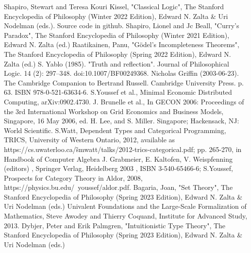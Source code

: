 \documentclass[11pt]{article}
\begin{document}
\begin{thebibliography}{10}
 Shapiro, Stewart and Teresa Kouri Kissel, "Classical Logic", The Stanford Encyclopedia of Philosophy (Winter 2022 Edition), Edward N. Zalta \& Uri Nodelman (eds.).
 Source code in github. 
 Shapiro, Lionel and Jc Beall, "Curry’s Paradox", The Stanford Encyclopedia of Philosophy (Winter 2021 Edition), Edward N. Zalta (ed.)
 Raatikainen, Panu, "Gödel’s Incompleteness Theorems", The Stanford Encyclopedia of Philosophy (Spring 2022 Edition), Edward N. Zalta (ed.)
 S. Yablo (1985). "Truth and reflection". Journal of Philosophical Logic. 14 (2): 297–348. doi:10.1007/BF00249368.
 Nicholas Griffin (2003-06-23). The Cambridge Companion to Bertrand Russell. Cambridge University Press. p. 63. ISBN 978-0-521-63634-6.
 S.Youssef et al., Minimal Economic Distributed Computing, arXiv:0902.4730.  J. Brunelle et al., In GECON 2006: Proceedings of the 3rd International Workshop on Grid Economics and Business Models, Singapore, 16 May 2006, ed. H. Lee, and S. Miller. Singapore; Hackensack, NJ: World Scientific.
 S.Watt, Dependent Types and Categorical Programming, TRICS, University of Western Ontario, 2012, available as {\rm https://cs.uwaterloo.ca/\~smwatt/talks/2012-trics-categorical.pdf}; pp. 265-270, in Handbook of Computer Algebra J. Grabmeier, E. Kaltofen, V. Weispfenning (editors) , Springer Verlag, Heidelberg 2003 , ISBN 3-540-65466-6; S.Youssef, Prospects for Category Theory in Aldor, 2008, {\rm https://physics.bu.edu/~youssef/aldor.pdf}. 
 Bagaria, Joan, "Set Theory", The Stanford Encyclopedia of Philosophy (Spring 2023 Edition), Edward N. Zalta \& Uri Nodelman (eds.)
 Univalent Foundations and the Large-Scale Formalization of Mathematics, Steve Awodey and Thierry Coquand, Institute for Advanced Study, 2013.
 Dybjer, Peter and Erik Palmgren, "Intuitionistic Type Theory", The Stanford Encyclopedia of Philosophy (Spring 2023 Edition), Edward N. Zalta \& Uri Nodelman (eds.)
\end{thebibliography}
\end{document}
